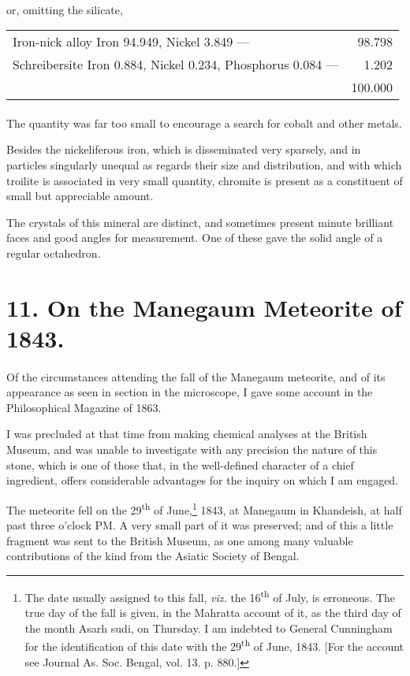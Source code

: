 \documentclass[a4paper, 12pt, oneside]{article}
\begin{document}
\paragraph{}
or, omitting the silicate,
\begin{table}[H]
    \centering
    \footnotesize
    \begin{tabular}{l r}
        Iron-nick alloy {Iron 94.949, Nickel 3.849} --- & 98.798\\
        Schreibersite {Iron 0.884, Nickel 0.234, Phosphorus 0.084} --- & 1.202\\ \hline
        ~ & 100.000
    \end{tabular}
\end{table}
\paragraph{}
The quantity was far too small to encourage a search for cobalt and other metals.

Besides the nickeliferous iron, which is disseminated very sparsely, and in particles singularly unequal as regards their size and distribution, and with which troilite is associated in very small quantity, chromite is present as a constituent of small but appreciable amount.

The crystals of this mineral are distinct, and sometimes present minute brilliant faces and good angles for measurement. One of these gave the solid angle of a regular octahedron.
\clearpage
\section{11. On the Manegaum Meteorite of 1843.}
\paragraph{}
Of the circumstances attending the fall of the Manegaum meteorite, and of its appearance as seen in section in the microscope, I gave some account in the Philosophical Magazine of 1863.

I was precluded at that time from making chemical analyses at the British Museum, and was unable to investigate with any precision the nature of this stone, which is one of those that, in the well-defined character of a chief ingredient, offers considerable advantages for the inquiry on which I am engaged.

The meteorite fell on the 29\textsuperscript{th} of June,\footnote{The date usually assigned to this fall, \emph{viz.} the 16\textsuperscript{th} of July, is erroneous. The true day of the fall is given, in the Mahratta account of it, as the third day of the month Asarh sudi, on Thursday. I am indebted to General Cunningham for the identification of this date with the 29\textsuperscript{th} of June, 1843. [For the account see Journal As. Soc. Bengal, vol. 13. p. 880.]} 1843, at Manegaum in Khandeish, at half past three o'clock PM. A very small part of it was preserved; and of this a little fragment was sent to the British Museum, as one among many valuable contributions of the kind from the Asiatic Society of Bengal.
\end{document}
